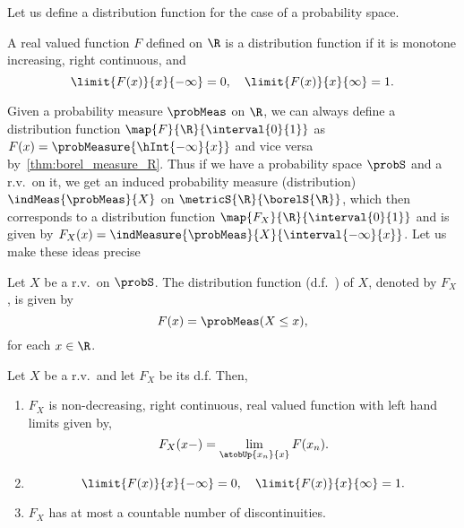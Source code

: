 Let us define
a distribution function for the case of a probability space.
\begin{Definition}[name=Distribution function]
    A real valued function $F$ defined on $\R$ is a distribution function if it is monotone increasing, right
    continuous, and 
    \[\limit{F(x)}{x}{-\infty} = 0,\quad \limit{F(x)}{x}{\infty} = 1.\]
\end{Definition}
Given a probability measure $\probMeas$ on $\R$, we can always define a distribution function
$\map{F}{\R}{\interval{0}{1}}$ as $F(x) = \probMeasure{\hInt{-\infty}{x}}$ and vice versa
by~\ref{thm:borel_measure_R}. Thus if we have a probability space $\probS$ and a r.v.~on it, we get an induced
probability measure (distribution) $\indMeas{\probMeas}{X}$ on $\metricS{\R}{\borelS{\R}}$,
which then corresponds to a distribution function $\map{F_X}{\R}{\interval{0}{1}}$ and is 
given by $F_X(x) = \indMeasure{\probMeas}{X}{\interval{-\infty}{x}}$.
Let us make these ideas precise
\begin{Definition}
    Let $X$ be a r.v.~on $\probS$. The distribution function (d.f.~) of $X$, denoted by $F_X$, is given by
    \[F(x) = \probMeas(X\leq x),\] for each $x \in \R$.
\end{Definition}
\begin{Theorem}
    Let $X$ be a r.v.~and let $F_X$ be its d.f. Then, 
    \begin{enumerate}
	\item
	    $F_X$ is non-decreasing, right continuous, real valued function with left hand limits given by,
	    \[F_X(x-) = \lim\limits_{\atobUp{x_n}{x}}F(x_n).\]
	\item
	    \[\limit{F(x)}{x}{-\infty} = 0,\quad \limit{F(x)}{x}{\infty} = 1.\]
	\item
	    $F_X$ has at most a countable number of discontinuities.
    \end{enumerate}
\end{Theorem}


